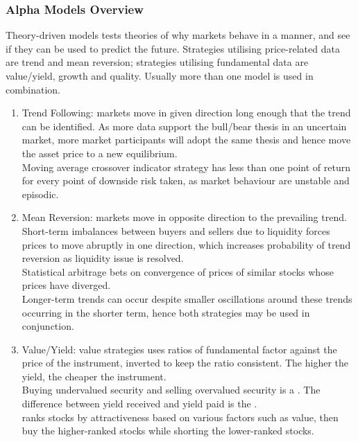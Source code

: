 \subsubsection{Alpha Models Overview}

Theory-driven models tests theories of why markets behave in a manner, and see if they can be used to predict the future. Strategies utilising price-related data are trend and mean reversion; strategies utilising fundamental data are value/yield, growth and quality. Usually more than one model is used in combination.

\begin{definition} 
\begin{enumerate}[label=\roman*.]
\setlength{\itemsep}{0pt}
\item Trend Following: markets move in given direction long enough that the trend can be identified. As more data support the bull/bear thesis in an uncertain market, more market participants will adopt the same thesis and hence move the asset price to a new equilibrium.\\
Moving average crossover indicator strategy has less than one point of return for every point of downside risk taken, as market behaviour are unstable and episodic.
\item Mean Reversion: markets move in opposite direction to the prevailing trend. Short-term imbalances between buyers and sellers due to liquidity forces prices to move abruptly in one direction, which increases probability of trend reversion as liquidity issue is resolved.\\
Statistical arbitrage bets on convergence of prices of similar stocks whose prices have diverged.\\
Longer-term trends can occur despite smaller oscillations around these trends occurring in the shorter term, hence both strategies may be used in conjunction.
\item Value/Yield:  value strategies uses ratios of fundamental factor against the price of the instrument, inverted to keep the ratio consistent. The higher the yield, the cheaper the instrument.\\
Buying undervalued security and selling overvalued security is a . The difference between yield received and yield paid is the .\\
 ranks stocks by attractiveness based on various factors such as value, then buy the higher-ranked stocks while shorting the lower-ranked stocks.

\end{enumerate}
\end{definition}
